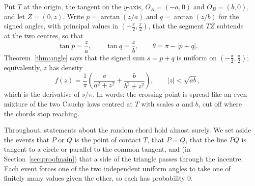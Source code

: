 \documentclass[11pt]{article}
\theoremstyle{remark}
\begin{document}
Put $T$ at the origin, the tangent on the $y$-axis, $O_A=(-a,0)$ and $O_B=(b,0)$, and let
$Z=(0,z)$. Write $p=\arctan(z/a)$ and $q=\arctan(z/b)$ for the signed angles, with principal
values in $(-\frac\pi2,\frac\pi2)$, that the segment $TZ$ subtends at the two centres, so that
\begin{equation}\label{eq:pq}
  \tan p=\frac za,\qquad \tan q=\frac zb,\qquad \theta=\pi-|p+q| .
\end{equation}
Theorem~\ref{thm:angle} says that the signed sum $s=p+q$ is uniform on $(-\frac\pi2,\frac\pi2)$; equivalently, $z$
has density
\begin{equation}\label{eq:density}
  f(z)=\frac1\pi\left(\frac{a}{a^2+z^2}+\frac{b}{b^2+z^2}\right),\qquad |z|<\sqrt{ab},
\end{equation}
which is the derivative of $s/\pi$. In words: the crossing point is spread like an even mixture
of the two Cauchy laws centred at $T$ with scales $a$ and $b$, cut off where the chords stop
reaching.

Throughout, statements about the random chord hold almost surely. We set aside the events that
$P$ or $Q$ is the point of contact $T$, that $P=Q$, that the line $PQ$ is tangent to a circle or
parallel to the common tangent, and (in Section~\ref{sec:proofmain}) that a side of the triangle passes
through the incentre. Each event forces one of the two independent uniform angles to take one of
finitely many values given the other, so each has probability $0$.
\end{document}
